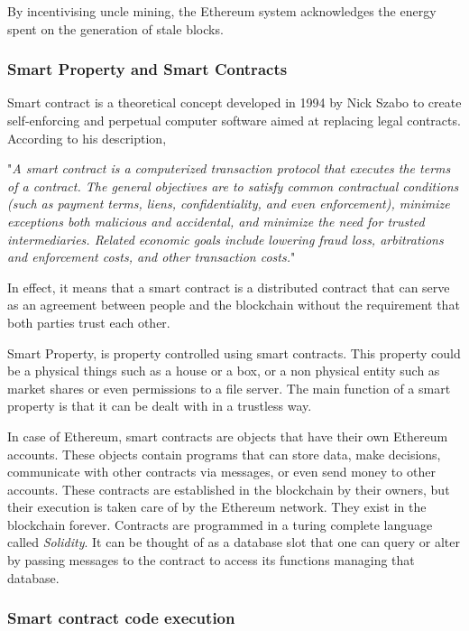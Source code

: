 \documentclass[english]{tktltiki}
\begin{document}
By incentivising uncle mining, the Ethereum system acknowledges the energy spent on the generation of stale blocks. 

\subsubsection{Smart Property and Smart Contracts} \label{Section:Smart_Contracts}

Smart contract \cite{NICK} is a theoretical concept developed in 1994 by Nick Szabo to create self-enforcing and perpetual computer software aimed at replacing legal contracts. According to his description, 

"\textit{A smart contract is a computerized transaction protocol that executes the terms of a contract. The general objectives are to satisfy common contractual conditions (such as payment terms, liens, confidentiality, and even enforcement), minimize exceptions both malicious and accidental, and minimize the need for trusted intermediaries. Related economic goals include lowering fraud loss, arbitrations and enforcement costs, and other transaction costs.}"

In effect, it means that a smart contract is a distributed contract that can serve as an agreement between people and the blockchain without the requirement that both parties trust each other. 

Smart Property\cite{NICK}, is property controlled using smart contracts. This property could be a physical things such as a house or a box, or a non physical entity such as market shares or even permissions to a file server. The main function of a smart property is that it can be dealt with in a trustless way.  

In case of Ethereum, smart contracts are objects that have their own Ethereum accounts. These objects contain programs that can store data, make decisions, communicate with other contracts via messages, or even send money to other accounts. These contracts are established in the blockchain by their owners, but their execution is taken care of by the Ethereum network. They exist in the blockchain forever. Contracts are programmed in a turing complete language called \textit{Solidity}. It can be thought of as a database slot that one can query or alter by passing messages to the contract to access its functions managing that database. 

\subsubsection*{Smart contract code execution}
\end{document}
